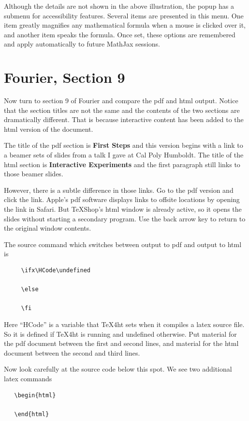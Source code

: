 \documentclass[11pt, oneside]{article}   	%
\begin{document}
Although the details are not shown in the above illustration, the popup has  a submenu for accessibility features. Several items are presented in this menu. One item greatly magnifies any mathematical formula when a mouse is clicked over it, and another item speaks the formula. Once set, these options are remembered and apply automatically to future MathJax sessions.

\newpage
 
\section{Fourier, Section 9}

Now turn to section 9 of Fourier and compare the pdf and html output. Notice that the section titles
are not the same and the contents of the two sections are dramatically different. That is because 
interactive content has been added to the html version of the document.

The title of the pdf section is {\bf First Steps} and this version begins with a link to a beamer sets of slides from a talk I gave at Cal Poly Humboldt. The title of the html section is {\bf Interactive Experiments} and 
the first paragraph still links to those beamer slides. 

However, there is a subtle difference in those links. Go to the pdf version and click the link. Apple's pdf software displays links to offsite locations by opening the link in Safari. But TeXShop's html window
is already active, so it opens the slides without starting a secondary program. Use the back arrow key to return to the original window contents.

The source command which switches between output to pdf and output to html is
\begin{verbatim}
     \ifx\HCode\undefined
     
     \else
     
     \fi     
\end{verbatim} 
Here ``HCode'' is a variable that TeX4ht sets when it compiles a latex source file. So it
is defined if TeX4ht is running and undefined otherwise. Put material for the pdf document between
the first and second lines, and material for the html document between the second and third lines.

Now look carefully at the source code below this spot. We see two additional latex commands
\begin{verbatim}
   \begin{html}
   
   \end{html}
\end{verbatim}
\end{document}
